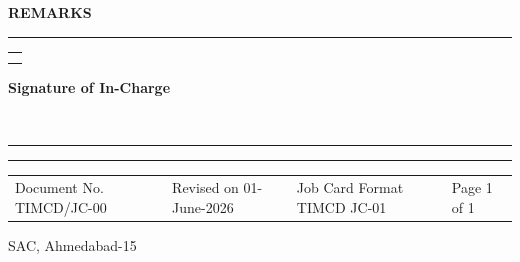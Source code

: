 \documentclass[a4paper,10pt]{article}
\newcommand{\sectiontitle}[1]
{
\vspace{2mm}

{\large\bfseries #1}

\vspace{0.5mm}

\hrule

\vspace{1.5mm}
}
\begin{document}

\sectiontitle{REMARKS}

\begin{tabularx}{\textwidth}{|X|}
\hline

\\[10mm]

\\
\hline

\end{tabularx}

\vspace{8mm}

\begin{flushright}

\textbf{Signature of In-Charge}

\\[5mm]

\rule{5cm}{0.4pt}

\end{flushright}

\vfill


\hrule
\vspace{2mm}

\footnotesize

\begin{tabularx}{\textwidth}{XXXX}
Document No. TIMCD/JC-00 &
Revised on 01-June-2026 &
Job Card Format TIMCD JC-01 &
Page 1 of 1
\end{tabularx}

\vspace{1mm}

\begin{flushright}
SAC, Ahmedabad-15
\end{flushright}
\end{document}
